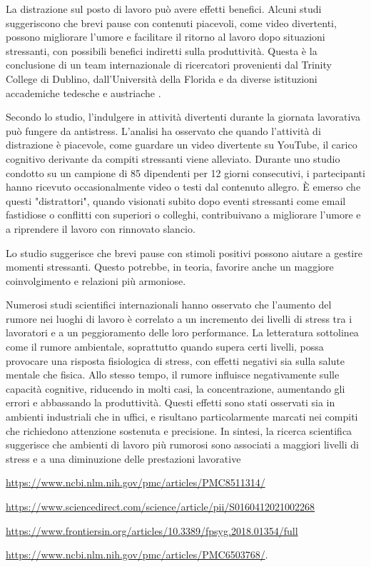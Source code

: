 \documentclass[12pt]{book} %
\begin{document}
\begin{mdframed}[linewidth=1pt]
La distrazione sul posto di lavoro può avere effetti benefici. Alcuni studi suggeriscono che brevi pause con contenuti piacevoli, come video divertenti, possono migliorare l’umore e facilitare il ritorno al lavoro dopo situazioni stressanti, con possibili benefici indiretti sulla produttività. Questa è la conclusione di un team internazionale di ricercatori provenienti dal Trinity College di Dublino, dall'Università della Florida e da diverse istituzioni accademiche tedesche e austriache .

Secondo lo studio, l'indulgere in attività divertenti durante la giornata lavorativa può fungere da antistress. L'analisi ha osservato che quando l'attività di distrazione è piacevole, come guardare un video divertente su YouTube, il carico cognitivo derivante da compiti stressanti viene alleviato. Durante uno studio condotto su un campione di 85 dipendenti per 12 giorni consecutivi, i partecipanti hanno ricevuto occasionalmente video o testi dal contenuto allegro. È emerso che questi "distrattori", quando visionati subito dopo eventi stressanti come email fastidiose o conflitti con superiori o colleghi, contribuivano a migliorare l'umore e a riprendere il lavoro con rinnovato slancio.

Lo studio suggerisce che brevi pause con stimoli positivi possono aiutare a gestire momenti stressanti. Questo potrebbe, in teoria, favorire anche un maggiore coinvolgimento e relazioni più armoniose.

Numerosi studi scientifici internazionali hanno osservato che l’aumento del rumore nei luoghi di lavoro è correlato a un incremento dei livelli di stress tra i lavoratori e a un peggioramento delle loro performance. La letteratura sottolinea come il rumore ambientale, soprattutto quando supera certi livelli, possa provocare una risposta fisiologica di stress, con effetti negativi sia sulla salute mentale che fisica. Allo stesso tempo, il rumore influisce negativamente sulle capacità cognitive, riducendo in molti casi, la concentrazione, aumentando gli errori e abbassando la produttività. Questi effetti sono stati osservati sia in ambienti industriali che in uffici, e risultano particolarmente marcati nei compiti che richiedono attenzione sostenuta e precisione. In sintesi, la ricerca scientifica suggerisce che ambienti di lavoro più rumorosi sono associati a maggiori livelli di stress e a una diminuzione delle prestazioni lavorative \raggedright\url{https://www.ncbi.nlm.nih.gov/pmc/articles/PMC8511314/} \raggedright\url{https://www.sciencedirect.com/science/article/pii/S0160412021002268} \raggedright\url{https://www.frontiersin.org/articles/10.3389/fpsyg.2018.01354/full} \raggedright\url{https://www.ncbi.nlm.nih.gov/pmc/articles/PMC6503768/}.
\end{mdframed}
\end{document}
